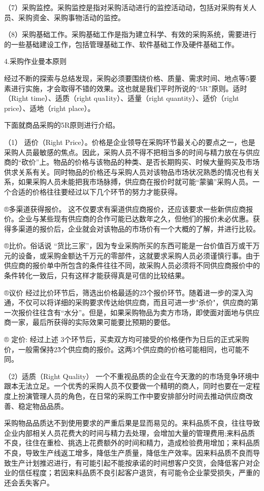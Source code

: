     （7）采购监控。采购监控是指对采购活动进行的监控活动动，包括对采购有关人员、采购资金、采购事物活动的监控。

    （8）采购基础工作。采购基础工作是指为建立科学、有效的采购系统，需要进行的一些基础建设工作，包括管理基础工作、软件基础工作及硬件基础工作。

    4.采购作业曼本原则

    经过不断的探索与总结发现，采购必须要围绕价格、质量、需求时间、地点等5要素进行实施，才会取得不错的效果。这也就是我们平时所说的“5R”原则。适时（Right time）、适质（right qua1ity）、适量（right quantity）、适价（right price）、适地（right place）。

    下面就商品采购的5R原则进行介绍。

    （1） 适价（Right Price）。价格是企业领导在采购环节最关心的要点之一，也是采购人员最敏感的焦点。因此，采购人员不得不把相当多的时间与精力放在与供应商的“砍价”上。物品的价格与该物品的种类、是否长期购买、时候大量购买及市场供求关系有关。同时物品的价格还与采购人员对该物品市场状况熟悉的情况也有关系，如果采购人员未能把我市场脉搏，供应商在报价时就可能“蒙骗”采购人员。一个合适的价格往往要经过以下几个环节的努力才能获得。

    ®多渠道获得报价。 这不仅要求有渠道供应商报价，还应该要求一些新供应商报价。企业与某些现有供应商的合作可能已达数年之久，但他们的报价未必优惠。获得多渠道的报价后，企业就会对该物品的市场价有一个大概的了解，并进行比较。

    ®比价。俗话说 “货比三家”，因为专业采购所买的东西可能是一台价值百万或干万元的设备，或采购金额达千万元的零部件，这就要求采购人员必须谨慎行事。由于供应商的报价单中所包含的条件往往不同，故采购人员必须将不同供应商报价中的条件转化一致后，只有这样才能获得真是可信的比较结果。

    ®议价 经过比价环节后，筛选出价格最适的2\~3个报价环节。随着进一步的深入沟通，不仅可以将详细的采购要求传达绐供应商，而且可进一步"杀价"，供应商的第一次报价往往含有“水分”。但是，如果采购物品为卖方市场，即使面对面地与供应商一家，最后所获得的实际效果可能要比预期的要低。

    ® 定价: 经过上述 3个环节后，买卖双方均可接受的价格便作为日后的正式采购价，一般需保持2\~3个供应商的报价。这两3个供应商的价格可能相同，也可能不同。

    （2）适质（Right Quality） 一个不重视品质的企业在今天激的的市场竞争环境中跟本无法立足。一个优秀的采购人员不仅要做一个精明的商人，同时也要在一定程度上扮演管理人员的角色，在日常的采购工作中要安排部分时间去推动供应商改善、稳定物品品质。

    采购物品品质达不到使用要求的严重后果是显而易见的。来料品质不良，往往导致企业内部相关人员花费大的时间与精力去处理，会增加大量的管理费用;来料品质不良，往住在重检、挑选上花费额外的时间和精力，造成检验费用增加；来料品质不良，导致生产线返工增多，降低生产质量，降低生产效率。因来料品质不良而导致生产计划推迟进行，有可能引起不能按承诺的时间想客户交货，会降低客户对企业的信任程度；若因来料品质不良引起客户退货，有可能令企业蒙受损失，严重的还会丢失客户。

